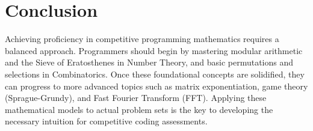 \documentclass[10pt,journal,compsoc,onecolumn]{IEEEtran}
\begin{document}
\section{Conclusion}
\label{sec:conclusion}

Achieving proficiency in competitive programming mathematics requires a balanced approach. Programmers should begin by mastering modular arithmetic and the Sieve of Eratosthenes in Number Theory, and basic permutations and selections in Combinatorics. Once these foundational concepts are solidified, they can progress to more advanced topics such as matrix exponentiation, game theory (Sprague-Grundy), and Fast Fourier Transform (FFT). Applying these mathematical models to actual problem sets is the key to developing the necessary intuition for competitive coding assessments.
\end{document}
